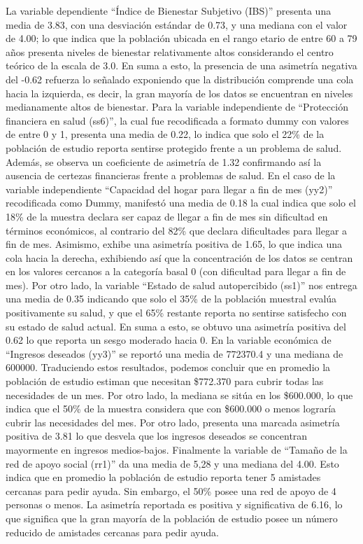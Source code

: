 \documentclass[
  spanish,
  a4paper,
  oneside]{scrbook}
\begin{document}
La variable dependiente ``Índice de Bienestar Subjetivo (IBS)'' presenta
una media de 3.83, con una desviación estándar de 0.73, y una mediana
con el valor de 4.00; lo que indica que la población ubicada en el rango
etario de entre 60 a 79 años presenta niveles de bienestar relativamente
altos considerando el centro teórico de la escala de 3.0. En suma a
esto, la presencia de una asimetría negativa del -0.62 refuerza lo
señalado exponiendo que la distribución comprende una cola hacia la
izquierda, es decir, la gran mayoría de los datos se encuentran en
niveles medianamente altos de bienestar. Para la variable independiente
de ``Protección financiera en salud (ss6)'', la cual fue recodificada a
formato dummy con valores de entre 0 y 1, presenta una media de 0.22, lo
indica que solo el 22\% de la población de estudio reporta sentirse
protegido frente a un problema de salud. Además, se observa un
coeficiente de asimetría de 1.32 confirmando así la ausencia de certezas
financieras frente a problemas de salud. En el caso de la variable
independiente ``Capacidad del hogar para llegar a fin de mes (yy2)''
recodificada como Dummy, manifestó una media de 0.18 la cual indica que
solo el 18\% de la muestra declara ser capaz de llegar a fin de mes sin
dificultad en términos económicos, al contrario del 82\% que declara
dificultades para llegar a fin de mes. Asimismo, exhibe una asimetría
positiva de 1.65, lo que indica una cola hacia la derecha, exhibiendo
así que la concentración de los datos se centran en los valores cercanos
a la categoría basal 0 (con dificultad para llegar a fin de mes). Por
otro lado, la variable ``Estado de salud autopercibido (ss1)'' nos
entrega una media de 0.35 indicando que solo el 35\% de la población
muestral evalúa positivamente su salud, y que el 65\% restante reporta
no sentirse satisfecho con su estado de salud actual. En suma a esto, se
obtuvo una asimetría positiva del 0.62 lo que reporta un sesgo moderado
hacia 0. En la variable económica de ``Ingresos deseados (yy3)'' se
reportó una media de 772370.4 y una mediana de 600000. Traduciendo estos
resultados, podemos concluir que en promedio la población de estudio
estiman que necesitan \$772.370 para cubrir todas las necesidades de un
mes. Por otro lado, la mediana se sitúa en los \$600.000, lo que indica
que el 50\% de la muestra considera que con \$600.000 o menos lograría
cubrir las necesidades del mes. Por otro lado, presenta una marcada
asimetría positiva de 3.81 lo que desvela que los ingresos deseados se
concentran mayormente en ingresos medios-bajos. Finalmente la variable
de ``Tamaño de la red de apoyo social (rr1)'' da una media de 5,28 y una
mediana del 4.00. Esto indica que en promedio la población de estudio
reporta tener 5 amistades cercanas para pedir ayuda. Sin embargo, el
50\% posee una red de apoyo de 4 personas o menos. La asimetría
reportada es positiva y significativa de 6.16, lo que significa que la
gran mayoría de la población de estudio posee un número reducido de
amistades cercanas para pedir ayuda.
\end{document}

